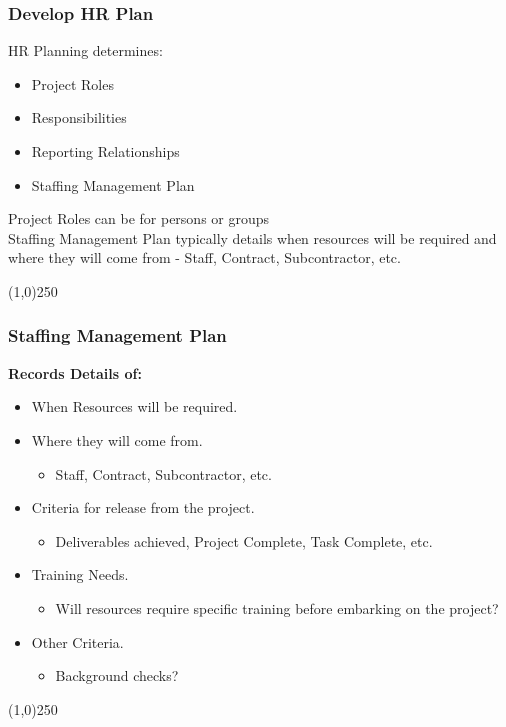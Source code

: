 
\begin{frame}
\frametitle{Develop HR Plan}
HR Planning determines:
\begin{itemize}	
	\item Project Roles
	\item Responsibilities
	\item Reporting Relationships
	\item Staffing Management Plan
\end{itemize}
Project Roles can be for persons or groups\\
Staffing Management Plan typically details when resources will be required and where they will come from - Staff, Contract, Subcontractor, etc.
\end{frame}\begin{center}\line(1,0){250}\end{center}


\begin{frame}
\frametitle{Staffing Management Plan}
\textbf{Records Details of:}
\begin{itemize}
	\item When Resources will be required.
	\item Where they will come from.
		\begin{itemize}	
			\item Staff, Contract, Subcontractor, etc.
		\end{itemize}	
	\item Criteria for release from the project.
			\begin{itemize}	
				\item Deliverables achieved, Project Complete, Task Complete, etc.
			\end{itemize}	
	\item Training Needs.
			\begin{itemize}	
				\item Will resources require specific training before embarking on the project?
			\end{itemize}	
	\item Other Criteria.
			\begin{itemize}	
				\item Background checks?
			\end{itemize}	
\end{itemize}
\end{frame}\begin{center}\line(1,0){250}\end{center}
 
